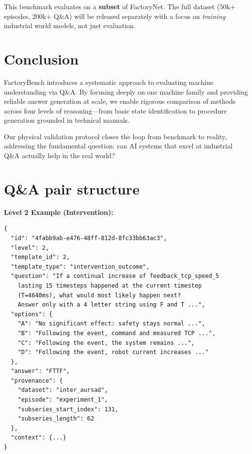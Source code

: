 \documentclass{article}
\begin{document}
This benchmark evaluates on a \textbf{subset} of FactoryNet. The full dataset (50k+ episodes, 200k+ Q\&A) will be released separately with a focus on \textit{training} industrial world models, not just evaluation.


\section{Conclusion}

FactoryBench introduces a systematic approach to evaluating machine understanding via Q\&A. By focusing deeply on one machine family and providing reliable answer generation at scale, we enable rigorous comparison of methods across four levels of reasoning---from basic state identification to procedure generation grounded in technical manuals.

Our physical validation protocol closes the loop from benchmark to reality, addressing the fundamental question: can AI systems that excel at industrial Q\&A actually help in the real world?




\newpage
\appendix

\section{Q\&A pair structure}

\textbf{Level 2 Example (Intervention):}

\begin{verbatim}
{
  "id": "4fabb9ab-e476-48ff-812d-8fc33bb63ac3",
  "level": 2,
  "template_id": 2,
  "template_type": "intervention_outcome",
  "question": "If a continual increase of feedback_tcp_speed_5
    lasting 15 timesteps happened at the current timestep
    (T=4640ms), what would most likely happen next?
    Answer only with a 4 letter string using F and T ...",
  "options": {
    "A": "No significant effect: safety stays normal ...",
    "B": "Following the event, command and measured TCP ...",
    "C": "Following the event, the system remains ...",
    "D": "Following the event, robot current increases ..."
  },
  "answer": "FTTF",
  "provenance": {
    "dataset": "inter_aursad",
    "episode": "experiment_1",
    "subseries_start_index": 131,
    "subseries_length": 62
  },
  "context": {...}
}
\end{verbatim}
\end{document}
